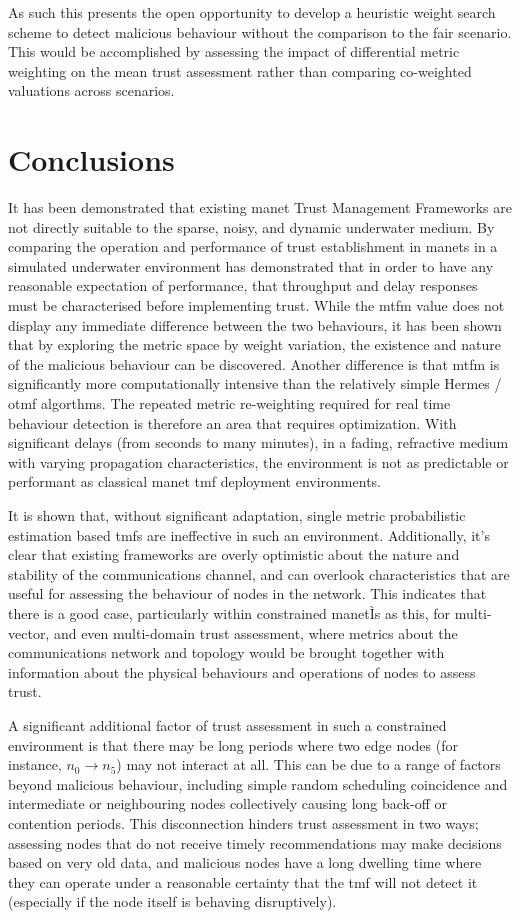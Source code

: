As such this presents the open opportunity to develop a heuristic weight search scheme to detect malicious behaviour without the comparison to the fair scenario.
This would be accomplished by assessing the impact of differential metric weighting on the mean trust assessment rather than comparing co-weighted valuations across scenarios.

\section{Conclusions}
It has been demonstrated that existing \gls{manet} Trust Management Frameworks are not directly suitable to the sparse, noisy, and dynamic underwater medium.
By comparing the operation and performance of trust establishment in \glspl{manet} in a simulated underwater environment has demonstrated that in order to have any reasonable expectation of performance, that throughput and delay responses must be characterised before implementing trust. 
While the \gls{mtfm} value does not display any immediate difference between the two behaviours, it has been shown that by exploring the metric space by weight variation, the existence and nature of the malicious behaviour can be discovered.
Another difference is that \gls{mtfm} is significantly more computationally intensive than the relatively simple Hermes / \gls{otmf} algorthms.
The repeated metric re-weighting required for real time behaviour detection is therefore an area that requires optimization.
With significant delays (from seconds to many minutes), in a fading, refractive medium with varying propagation characteristics, the environment is not as predictable or performant as classical \gls{manet} \gls{tmf} deployment environments.

It is shown that, without significant adaptation, single metric probabilistic estimation based \glspl{tmf} are ineffective in such an environment.
Additionally, it's clear that existing frameworks are overly optimistic about the nature and stability of the communications channel, and can overlook characteristics that are useful for assessing the behaviour of nodes in the network. 
This indicates that there is a good case, particularly within constrained \gls{manet}Ìs as this, for multi-vector, and even multi-domain trust assessment, where metrics about the communications network and topology would be brought together with information about the physical behaviours and operations of nodes to assess trust.


A significant additional factor of trust assessment in such a constrained environment is that there may be long periods where two edge nodes (for instance, $n_0 \to n_5$) may not interact at all. 
This can be due to a range of factors beyond malicious behaviour, including simple random scheduling coincidence and intermediate or neighbouring nodes collectively causing long back-off or contention periods.
This disconnection hinders trust assessment in two ways; assessing nodes that do not receive timely recommendations may make decisions based on very old data, and malicious nodes have a long dwelling time where they can operate under a reasonable certainty that the \gls{tmf} will not detect it (especially if the node itself is behaving disruptively).

